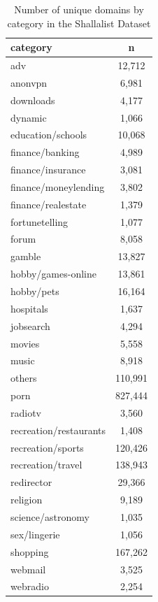 \documentclass[12pt, letterpaper]{article}
\begin{document}
\begin{table}[h!]
\centering
\tiny
\caption{Number of unique domains by category in the Shallalist Dataset}
\begin{tabular}{ l c }
\hline
category               & n \\
\hline
adv                    & 12,712  \\
anonvpn                & 6,981   \\
downloads              & 4,177   \\
dynamic                & 1,066   \\
education/schools      & 10,068  \\
finance/banking        & 4,989   \\
finance/insurance      & 3,081   \\
finance/moneylending   & 3,802   \\
finance/realestate     & 1,379   \\
fortunetelling         & 1,077   \\
forum                  & 8,058   \\
gamble                 & 13,827  \\
hobby/games-online     & 13,861  \\
hobby/pets             & 16,164  \\
hospitals              & 1,637   \\
jobsearch              & 4,294   \\
movies                 & 5,558   \\
music                  & 8,918   \\
others                 & 110,991 \\
porn                   & 827,444 \\
radiotv                & 3,560   \\
recreation/restaurants & 1,408   \\
recreation/sports      & 120,426 \\
recreation/travel      & 138,943 \\
redirector             & 29,366  \\
religion               & 9,189   \\
science/astronomy      & 1,035   \\
sex/lingerie           & 1,056   \\
shopping               & 167,262 \\
webmail                & 3,525   \\
webradio               & 2,254  \\
\hline
\end{tabular}
\label{tab:shalla_data}
\end{table}
\end{document}
